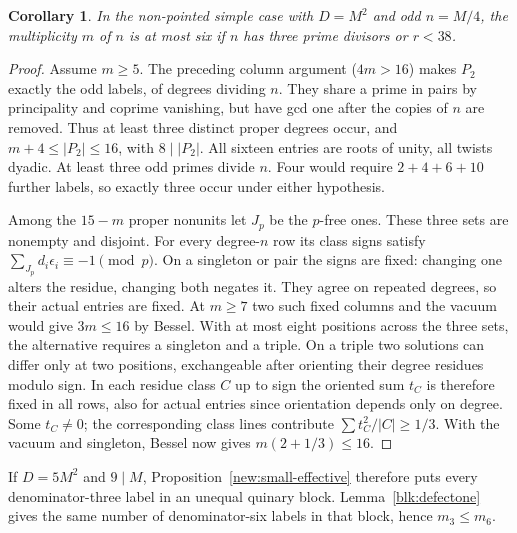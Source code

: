 \documentclass[11pt]{amsart}
\numberwithin{equation}{section}
\newtheorem{corollary}[theorem]{Corollary}
\theoremstyle{definition}
\theoremstyle{plain}
\begin{document}
\begin{corollary}\label{sq:odd-small}
In the non-pointed simple case with $D=M^2$ and odd $n=M/4$, the
multiplicity $m$ of $n$ is at most six if $n$ has three prime divisors
or $r<38$.
\end{corollary}
\begin{proof}
Assume $m\ge5$. The preceding column argument ($4m>16$) makes $P_2$
exactly the odd labels, of degrees dividing $n$. They share a prime
in pairs by principality and coprime vanishing, but have gcd one
after the copies of $n$ are removed. Thus at least three distinct
proper degrees occur, and $m+4\le|P_2|\le16$, with $8\mid|P_2|$.
All sixteen entries are roots of unity, all twists dyadic. At least
three odd primes divide $n$. Four would require $2+4+6+10$ further
labels, so exactly three occur under either hypothesis.

Among the $15-m$ proper nonunits let $J_p$ be the $p$-free ones.
These three sets are nonempty and disjoint. For every degree-$n$ row
its class signs satisfy $\sum_{J_p}d_i\epsilon_i\equiv-1\pmod p$.
On a singleton or pair the signs are fixed: changing one alters the
residue, changing both negates it. They agree on repeated degrees,
so their actual entries are fixed. At $m\ge7$ two such fixed columns
and the vacuum would give $3m\le16$ by Bessel. With at most eight
positions across the three sets, the alternative requires a singleton
and a triple.
On a triple two solutions can differ only at two positions, exchangeable
after orienting their degree residues modulo sign. In each residue
class $C$ up to sign the oriented sum $t_C$ is therefore fixed in
all rows, also for actual entries since orientation depends only on
degree. Some $t_C\ne0$; the corresponding class lines contribute
$\sum t_C^2/|C|\ge1/3$. With the vacuum and singleton, Bessel now
gives $m(2+1/3)\le16$.

\end{proof}

If $D=5M^2$ and $9\mid M$, Proposition~\ref{new:small-effective}
therefore puts every denominator-three label in an unequal quinary
block. Lemma~\ref{blk:defectone} gives the same number of
denominator-six labels in that block, hence $m_3\le m_6$.
\end{document}
